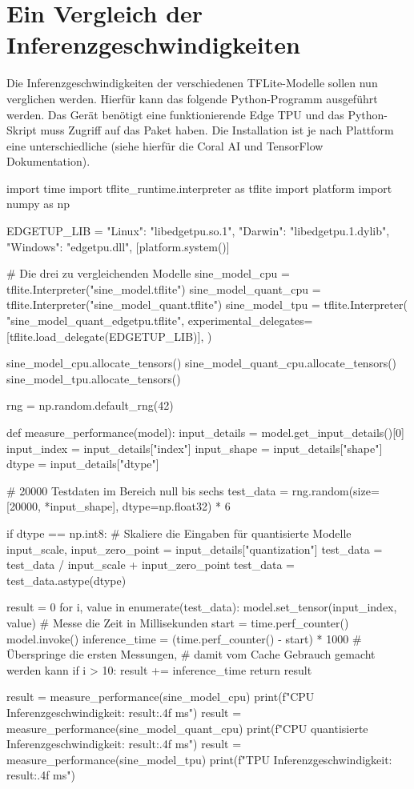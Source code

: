 \section{Ein Vergleich der Inferenzgeschwindigkeiten}
Die Inferenzgeschwindigkeiten der verschiedenen TFLite-Modelle
sollen nun verglichen werden. Hierfür kann das folgende Python-Programm
ausgeführt werden.
Das Gerät benötigt eine funktionierende Edge TPU
und das Python-Skript muss Zugriff auf
das  Paket haben.
Die Installation ist je nach Plattform eine unterschiedliche
(siehe hierfür die Coral AI und TensorFlow Dokumentation).
\begin{pythoncode}
import time
import tflite_runtime.interpreter as tflite
import platform
import numpy as np

EDGETUP_LIB = {
    "Linux": "libedgetpu.so.1",
    "Darwin": "libedgetpu.1.dylib",
    "Windows": "edgetpu.dll",
}[platform.system()]

# Die drei zu vergleichenden Modelle
sine_model_cpu = tflite.Interpreter("sine_model.tflite")
sine_model_quant_cpu = tflite.Interpreter("sine_model_quant.tflite")
sine_model_tpu = tflite.Interpreter(
    "sine_model_quant_edgetpu.tflite",
    experimental_delegates=[tflite.load_delegate(EDGETUP_LIB)],
)

sine_model_cpu.allocate_tensors()
sine_model_quant_cpu.allocate_tensors()
sine_model_tpu.allocate_tensors()

rng = np.random.default_rng(42)

def measure_performance(model):
    input_details = model.get_input_details()[0]
    input_index = input_details["index"]
    input_shape = input_details["shape"]
    dtype = input_details["dtype"]

    # 20000 Testdaten im Bereich null bis sechs
    test_data = rng.random(size=[20000, *input_shape], dtype=np.float32) * 6

    if dtype == np.int8:
        # Skaliere die Eingaben für quantisierte Modelle
        input_scale, input_zero_point = input_details["quantization"]
        test_data = test_data / input_scale + input_zero_point
        test_data = test_data.astype(dtype)

    result = 0
    for i, value in enumerate(test_data):
        model.set_tensor(input_index, value)
        # Messe die Zeit in Millisekunden
        start = time.perf_counter()
        model.invoke()
        inference_time = (time.perf_counter() - start) * 1000
        # Überspringe die ersten Messungen,
        # damit vom Cache Gebrauch gemacht werden kann
        if i > 10:
            result += inference_time
    return result

result = measure_performance(sine_model_cpu)
print(f"CPU Inferenzgeschwindigkeit: {result:.4f} ms")
result = measure_performance(sine_model_quant_cpu)
print(f"CPU quantisierte Inferenzgeschwindigkeit: {result:.4f} ms")
result = measure_performance(sine_model_tpu)
print(f"TPU Inferenzgeschwindigkeit: {result:.4f} ms")
\end{pythoncode}
